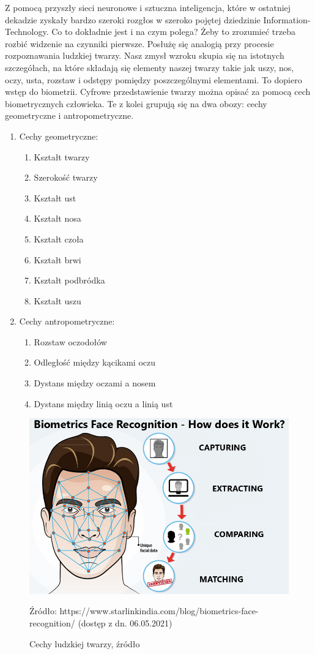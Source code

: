 \documentclass{article}
\begin{document}
	\par
	Z pomocą przyszły sieci neuronowe i sztuczna inteligencja, które w ostatniej dekadzie zyskały bardzo szeroki rozgłos w szeroko pojętej dziedzinie Information-Technology. Co to dokładnie jest i na czym polega? Żeby to zrozumieć trzeba rozbić widzenie na czynniki pierwsze. Posłużę się analogią przy procesie rozpoznawania ludzkiej twarzy. Nasz zmysł wzroku skupia się na istotnych szczegółach, na które składają się elementy naszej twarzy takie jak uszy, nos, oczy, usta, rozstaw i odstępy pomiędzy poszczególnymi elementami. To dopiero wstęp do biometrii. Cyfrowe przedstawienie twarzy można opisać za pomocą cech biometrycznych człowieka. Te z kolei grupują się na dwa obozy: cechy geometryczne i antropometryczne.
	\begin{enumerate}
		\item Cechy geometryczne:
		\begin{enumerate}
			\item Kształt twarzy
			\item Szerokość twarzy
			\item Kształt ust
			\item Kształt nosa
			\item Kształt czoła
			\item Kształt brwi
			\item Kształt podbródka
			\item Kształt uszu
		\end{enumerate}
		\item Cechy antropometryczne:
		\begin{enumerate}
			\item Rozstaw oczodołów
			\item Odległość między kącikami oczu
			\item Dystans między oczami a nosem
			\item Dystans między linią oczu a linią ust
		\end{enumerate}
	\end{enumerate}
	\begin{figure}
		\centering
		\includegraphics[width=15cm]{face}
		\caption{Cechy ludzkiej twarzy, źródło}
		Źródło: https://www.starlinkindia.com/blog/biometrics-face-recognition/ (dostęp z dn. 06.05.2021)
	\end{figure}
\end{document}
